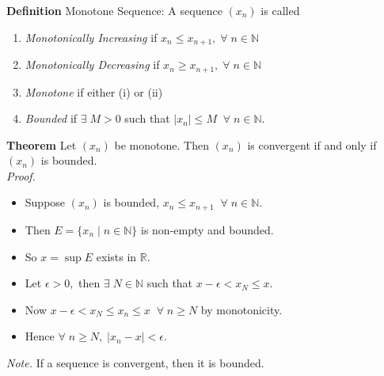 \documentclass[12pt]{article}
\begin{document}
\vspace{1\baselineskip}
\begin{block}{\bf Definition} Monotone Sequence: A sequence $(x_n)$ is called
\begin{enumerate}[label=(\roman*)]
    \item {\sl Monotonically Increasing }  if $x_n\le x_{n+1},\;\forall\;n\in\mathbb{N}$
    \item {\sl Monotonically Decreasing }  if $x_n\ge x_{n+1},\;\forall\;n\in\mathbb{N}$
    \item {\sl Monotone } if either (i) or (ii)
    \item {\sl Bounded } if $\exists\;M>0$ such that $|x_n|\le M\;\;\forall\;n\in\mathbb{N}$.
\end{enumerate}

\vspace{1\baselineskip}
\begin{block}{\bf Theorem} Let $(x_n)$ be monotone. Then $(x_n)$ is convergent if and only if $(x_n)$ is bounded.\\

{\sl Proof.}
\begin{itemize}
    \item Suppose $(x_n)$ is bounded, $x_n\le x_{n+1}\;\;\forall\;n\in\mathbb{N}.$
    \item Then $E = \{x_n\;|\;n\in\mathbb{N} \}$ is non-empty and bounded.
    \item So $x=\sup E$ exists in $\mathbb{R}$.
    \item Let $\epsilon>0,$ then $\exists\;N\in\mathbb{N}$ such that $x-\epsilon<x_N\le x$.
    \item Now $x-\epsilon <x_N\le x_n\le x\;\;\forall\;n\ge N$ by monotonicity.
    \item Hence $\forall\;n\ge N,\;|x_n-x|<\epsilon.$
\end{itemize}
{\sl Note. }If a sequence is convergent, then it is bounded.
\end{block}
\end{block}

\newpage
\end{document}
